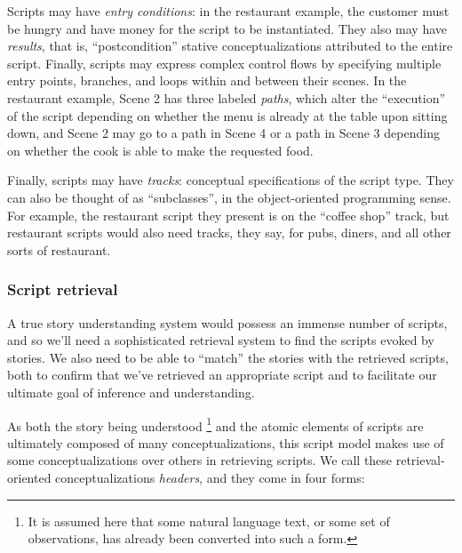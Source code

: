 Scripts may have \textit{entry conditions}: in the restaurant example, the customer must be hungry and have money for the script to be instantiated. They also may have \textit{results}, that is, ``postcondition'' stative conceptualizations attributed to the entire script. Finally, scripts may express complex control flows by specifying multiple entry points, branches, and loops within and between their scenes. In the restaurant example, Scene 2 has three labeled \textit{paths}, which alter the ``execution'' of the script depending on whether the menu is already at the table upon sitting down, and Scene 2 may go to a path in Scene 4 or a path in Scene 3 depending on whether the cook is able to make the requested food.

Finally, scripts may have \textit{tracks}: conceptual specifications of the script type. They can also be thought of as ``subclasses'', in the object-oriented programming sense. For example, the restaurant script they present is on the ``coffee shop'' track, but restaurant scripts would also need tracks, they say, for pubs, diners, and all other sorts of restaurant.

\iffalse
\subsubsection{Script retrieval}
A true story understanding system would possess an immense number of scripts, and so we'll need a sophisticated retrieval system to find the scripts evoked by stories. We also need to be able to ``match'' the stories with the retrieved scripts, both to confirm that we've retrieved an appropriate script and to facilitate our ultimate goal of inference and understanding.%

As both the story being understood \footnote{It is assumed here that some natural language text, or some set of observations, has already been converted into such a form.} and the atomic elements of scripts are ultimately composed of many conceptualizations, this script model makes use of some conceptualizations over others in retrieving scripts. We call these retrieval-oriented conceptualizations \textit{headers}, and they come in four forms:

